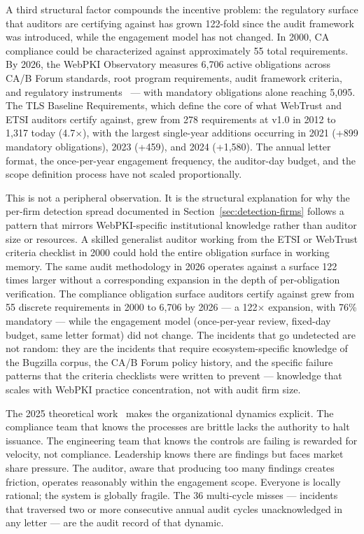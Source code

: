 \documentclass[10pt,twocolumn,letterpaper]{article}
\begin{document}
A third structural factor compounds the incentive problem: the
regulatory surface that auditors are certifying against has grown
122-fold since the audit framework was introduced, while the
engagement model has not changed. In 2000, CA compliance could be
characterized against approximately 55 total requirements. By 2026,
the WebPKI Observatory measures 6,706 active obligations across
CA/B Forum standards, root program requirements, audit framework
criteria, and regulatory instruments~\cite{snapshot} --- with
mandatory obligations alone reaching 5,095. The TLS Baseline
Requirements, which define the core of what WebTrust and ETSI
auditors certify against, grew from 278 requirements at v1.0 in
2012 to 1,317 today (4.7$\times$), with the largest single-year
additions occurring in 2021 (+899 mandatory obligations), 2023
(+459), and 2024 (+1,580). The annual letter format, the
once-per-year engagement frequency, the auditor-day budget, and the
scope definition process have not scaled proportionally.

This is not a peripheral observation. It is the structural explanation
for why the per-firm detection spread documented in
Section~\ref{sec:detection-firms} follows a pattern that mirrors
WebPKI-specific institutional knowledge rather than auditor size or
resources. A skilled generalist auditor working from the ETSI or
WebTrust criteria checklist in 2000 could hold the entire obligation
surface in working memory. The same audit methodology in 2026
operates against a surface 122 times larger without a corresponding
expansion in the depth of per-obligation verification. The compliance
obligation surface auditors certify against grew from 55 discrete
requirements in 2000 to 6,706 by 2026 --- a 122$\times$ expansion,
with 76\% mandatory --- while the engagement model (once-per-year
review, fixed-day budget, same letter format) did not change. The
incidents that go undetected are not random: they are the incidents that require
ecosystem-specific knowledge of the Bugzilla corpus, the CA/B Forum
policy history, and the specific failure patterns that the criteria
checklists were written to prevent --- knowledge that scales with
WebPKI practice concentration, not with audit firm size.

The 2025 theoretical work~\cite{hurst2025} makes the organizational dynamics explicit.
The compliance team that knows the processes are brittle lacks the
authority to halt issuance. The engineering team that knows the controls
are failing is rewarded for velocity, not compliance. Leadership knows
there are findings but faces market share pressure. The auditor, aware
that producing too many findings creates friction, operates reasonably
within the engagement scope. Everyone is locally rational; the system
is globally fragile. The 36 multi-cycle misses --- incidents that
traversed two or more consecutive annual audit cycles unacknowledged
in any letter --- are the audit record of that dynamic.
\end{document}
